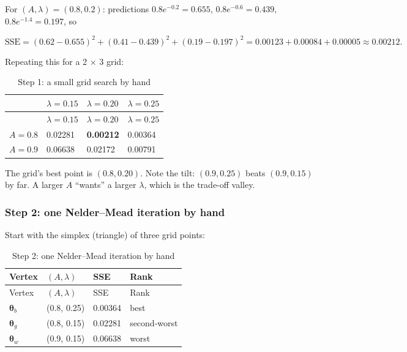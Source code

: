 For \((A, \lambda) = (0.8, 0.2)\): predictions \(0.8e^{-0.2} = 0.655\),
\(0.8e^{-0.6} = 0.439\), \(0.8e^{-1.4} = 0.197\), so

\[
\mathrm{SSE} = (0.62 - 0.655)^2 + (0.41 - 0.439)^2 + (0.19 - 0.197)^2 = 0.00123 + 0.00084 + 0.00005 \approx 0.00212.
\]

Repeating this for a 2 × 3 grid:

\begin{longtable}[]{@{}llll@{}}
\caption{\centering Step 1: a small grid search by hand}\tabularnewline
\toprule\noalign{}
& \(\lambda = 0.15\) & \(\lambda = 0.20\) & \(\lambda = 0.25\) \\
\midrule\noalign{}
\endfirsthead
\toprule\noalign{}
& \(\lambda = 0.15\) & \(\lambda = 0.20\) & \(\lambda = 0.25\) \\
\midrule\noalign{}
\endhead
\bottomrule\noalign{}
\endlastfoot
\(A = 0.8\) & 0.02281 & \textbf{0.00212} & 0.00364 \\
\(A = 0.9\) & 0.06638 & 0.02172 & 0.00791 \\
\end{longtable}

The grid's best point is \((0.8, 0.20)\). Note the tilt: \((0.9, 0.25)\)
beats \((0.9, 0.15)\) by far. A larger \(A\) ``wants'' a larger
\(\lambda\), which is the trade-off valley.

\subsubsection{Step 2: one Nelder--Mead iteration by hand}

Start with the simplex (triangle) of three grid points:

\begin{longtable}[]{@{}llll@{}}
\caption{\centering Step 2: one Nelder--Mead iteration by hand}\tabularnewline
\toprule\noalign{}
Vertex & \((A, \lambda)\) & SSE & Rank \\
\midrule\noalign{}
\endfirsthead
\toprule\noalign{}
Vertex & \((A, \lambda)\) & SSE & Rank \\
\midrule\noalign{}
\endhead
\bottomrule\noalign{}
\endlastfoot
\(\boldsymbol\theta_b\) & (0.8, 0.25) & 0.00364 & best \\
\(\boldsymbol\theta_g\) & (0.8, 0.15) & 0.02281 & second-worst \\
\(\boldsymbol\theta_w\) & (0.9, 0.15) & 0.06638 & worst \\
\end{longtable}

